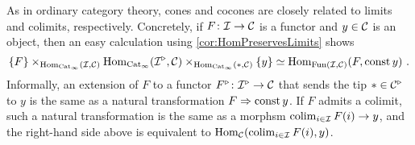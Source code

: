 \begin{con}
	As in ordinary category theory, cones and cocones are closely related to limits and colimits, respectively. Concretely, if $F\colon \mathcal{I}\rightarrow \mathcal{C}$ is a functor and $y\in\mathcal{C}$ is an object, then an easy calculation using \cref{cor:HomPreservesLimits} shows
	\begin{equation*}
		\{F\}\times_{\operatorname{Hom}_{\mathrm{Cat}_\infty}(\mathcal{I},\mathcal{C})}\operatorname{Hom}_{\mathrm{Cat}_\infty}\!\left(\mathcal{I}^\triangleright,\mathcal{C}\right)\times_{\operatorname{Hom}_{\mathrm{Cat}_\infty}(*,\mathcal{C})}\{y\}\simeq \operatorname{Hom}_{\operatorname{Fun}(\mathcal{I},\mathcal{C})}\!\left(F,\operatorname{const} y\right)\,.
	\end{equation*}
	Informally, an extension of $F$ to a functor $F^\triangleright \colon \mathcal{I}^\triangleright\rightarrow \mathcal{C}$ that sends the tip $*\in \mathcal{C}^\triangleright$ to $y$ is the same as a natural transformation $F\Rightarrow \operatorname{const} y$. If $F$ admits a colimit, such a natural transformation is the same as a morphsm $\operatorname*{colim}_{i\in\mathcal{I}}F(i)\rightarrow y$, and the right-hand side above is equivalent to $\operatorname{Hom}_{\mathcal{C}}(\operatorname*{colim}_{i\in\mathcal{I}}F(i),y)$.
\end{con}
